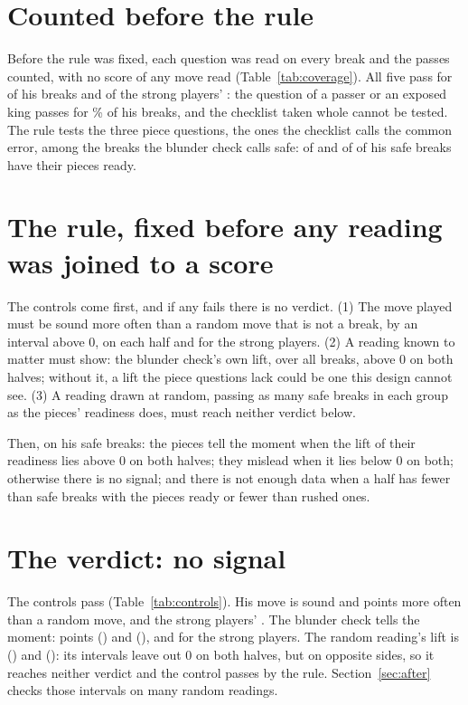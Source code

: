 \documentclass[11pt]{article}
\begin{document}
\section{Counted before the rule}

Before the rule was fixed, each question was read on every break and the passes counted, with no
score of any move read (Table~\ref{tab:coverage}). All five pass for \AllFive{} of his
\BreaksAll{} breaks and \AllFiveStrong{} of the strong players' \StrongBreaks: the question of a
passer or an exposed king passes for \PurposeShare\% of his breaks, and the checklist taken whole
cannot be tested. The rule tests the three piece questions, the ones the checklist calls the
common error, among the breaks the blunder check calls safe: \ReadyFirst{} of \SafeFirst{} and
\ReadySecond{} of \SafeSecond{} of his safe breaks have their pieces ready.

\CoverageTable

\section{The rule, fixed before any reading was joined to a score}

The controls come first, and if any fails there is no verdict. (1) The move played must be sound
more often than a random move that is not a break, by an interval above 0, on each half and for
the strong players. (2) A reading known to matter must show: the blunder check's own lift, over
all breaks, above 0 on both halves; without it, a lift the piece questions lack could be one this
design cannot see. (3) A reading drawn at random, passing as many safe breaks in each group as
the pieces' readiness does, must reach neither verdict below.

Then, on his safe breaks: the pieces tell the moment when the lift of their readiness lies above
0 on both halves; they mislead when it lies below 0 on both; otherwise there is no signal; and
there is not enough data when a half has fewer than \MinArm{} safe breaks with the pieces ready or
fewer than \MinArm{} rushed ones.

\section{The verdict: no signal}

The controls pass (Table~\ref{tab:controls}). His move is sound \ControlFirst{} and
\ControlSecond{} points more often than a random move, and the strong players' \StrongControl.
The blunder check tells the moment: \CheckFirst{} points (\CheckFirstCi) and \CheckSecond{}
(\CheckSecondCi), and \StrongCheck{} for the strong players. The random reading's lift is
\NullFirst{} (\NullFirstCi) and \NullSecond{} (\NullSecondCi): its intervals leave out 0 on both
halves, but on opposite sides, so it reaches neither verdict and the control passes by the rule.
Section~\ref{sec:after} checks those intervals on many random readings.
\end{document}
